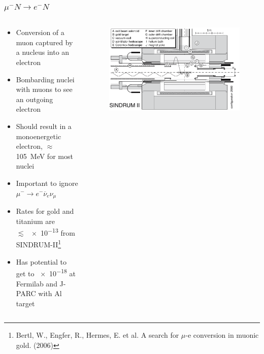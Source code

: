 \documentclass[11pt]{beamer}
\begin{document}
\begin{frame}
    \frametitle{$\mu^- N \rightarrow e^- N$}

    \begin{columns}[c]
        \begin{column}{0.6\textwidth}
            \begin{itemize}
                \item Conversion of a muon captured by a nucleus into an electron
                \item Bombarding nuclei with muons to see an outgoing electron
                \item Should result in a monoenergetic electron, $\approx$\SI{105}{\mega\electronvolt} for most nuclei
                \item Important to ignore $\mu^-\rightarrow e^- \overline{\nu}_e \nu_\mu$
                \item Rates for gold and titanium are \\$\lesssim$ \num{e-13} from SINDRUM-II\footnote[frame]{Bertl, W., Engfer, R., Hermes, E. et al. A search for $\mu$-e conversion in muonic gold. (2006)}
                \item Has potential to get to \num{e-18} at Fermilab and J-PARC with Al target
            \end{itemize}
        \end{column}
        \begin{column}{0.4\textwidth}
            \begin{figure}[h]
                \begin{center}
                    \includegraphics[width=\textwidth]{SINDRUMII.png}
                \end{center}
            \end{figure}
        \end{column}
    \end{columns}
    

\end{frame}
\end{document}

